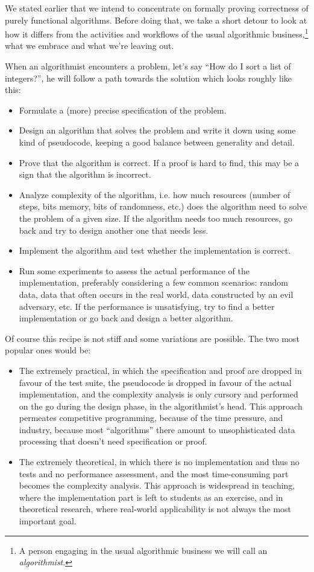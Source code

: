 \documentclass[declaration,mgr,english,shortabstract]{iithesis}
\begin{document}
We stated earlier that we intend to concentrate on formally proving correctness of purely functional algorithms. Before doing that, we take a short detour to look at how it differs from the activities and workflows of the usual algorithmic business,\footnote{A person engaging in the usual algorithmic business we will call an \textit{algorithmist}.} what we embrace and what we're leaving out.

When an algorithmist encounters a problem, let's say ``How do I sort a list of integers?'', he will follow a path towards the solution which looks roughly like this:

\begin{itemize}
    \item Formulate a (more) precise specification of the problem.
    \item Design an algorithm that solves the problem and write it down using some kind of pseudocode, keeping a good balance between generality and detail.
    \item Prove that the algorithm is correct. If a proof is hard to find, this may be a sign that the algorithm is incorrect.
    \item Analyze complexity of the algorithm, i.e. how much resources (number of steps, bits memory, bits of randomness, etc.) does the algorithm need to solve the problem of a given size. If the algorithm needs too much resources, go back and try to design another one that needs less.
    \item Implement the algorithm and test whether the implementation is correct.
    \item Run some experiments to assess the actual performance of the implementation, preferably considering a few common scenarios: random data, data that often occurs in the real world, data constructed by an evil adversary, etc. If the performance is unsatisfying, try to find a better implementation or go back and design a better algorithm.
\end{itemize}

Of course this recipe is not stiff and some variations are possible. The two most popular ones would be:

\begin{itemize}
    \item The extremely practical, in which the specification and proof are dropped in favour of the test suite, the pseudocode is dropped in favour of the actual implementation, and the complexity analysis is only cursory and performed on the go during the design phase, in the algorithmist's head. This approach permeates competitive programming, because of the time pressure, and industry, because most ``algorithms'' there amount to unsophisticated data processing that doesn't need specification or proof.
    \item The extremely theoretical, in which there is no implementation and thus no tests and no performance assessment, and the most time-consuming part becomes the complexity analysis. This approach is widespread in teaching, where the implementation part is left to students as an exercise, and in theoretical research, where real-world applicability is not always the most important goal.
\end{itemize}
\end{document}
